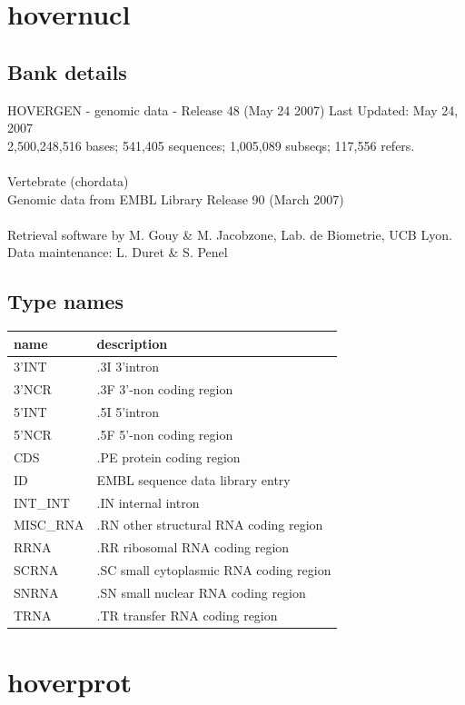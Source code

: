 \documentclass{article}
\begin{document}
\begin{Schunk}
\section{ hovernucl }
\subsection{Bank details}
HOVERGEN - genomic data - Release 48 (May 24 2007) Last Updated: May 24, 2007\\
2,500,248,516 bases; 541,405 sequences; 1,005,089 subseqs; 117,556 refers.\\
\\
Vertebrate (chordata)\\
Genomic data from EMBL Library Release 90 (March 2007)\\
\\
Retrieval software by M. Gouy \& M. Jacobzone, Lab. de Biometrie, UCB Lyon.\\
Data maintenance: L. Duret \& S. Penel\\


\subsection{Type names}
\noindent\begin{tabular}{ll}
\hline \hline
name & description\\
\hline
3'INT & .3I 3'intron \\
3'NCR & .3F  3'-non coding region \\
5'INT & .5I 5'intron \\
5'NCR & .5F  5'-non coding region \\
CDS & .PE protein coding region \\
ID & EMBL sequence data library entry \\
INT\_INT & .IN  internal intron \\
MISC\_RNA & .RN other structural RNA coding region \\
RRNA & .RR ribosomal RNA coding region \\
SCRNA & .SC small cytoplasmic RNA coding region \\
SNRNA & .SN small nuclear RNA coding region \\
TRNA & .TR transfer RNA coding region \\
\hline \hline
\end{tabular}

\section{ hoverprot }

\end{Schunk}
\end{document}
